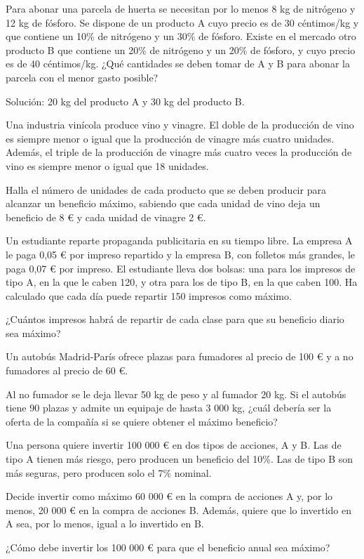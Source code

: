 \begin{Ejer}
Para abonar una parcela de huerta se necesitan por lo menos 8 kg de nitr\'ogeno y 12 kg de f\'osforo. Se dispone de un producto A cuyo precio es de 30 c\'entimos/kg y que contiene un 10\% de nitr\'ogeno y un 30\% de f\'osforo. Existe en el mercado otro producto B que contiene un 20\% de nitr\'ogeno y un 20\% de f\'osforo, y cuyo precio es de 40 c\'entimos/kg. ¿Qu\'e cantidades se deben tomar de A y B para abonar la parcela con el menor gasto posible?

Soluci\'on: 20 kg del producto A y 30 kg del producto B.
\end{Ejer}

\begin{Ejer}
Una industria vin\'icola produce vino y vinagre. El doble de la producci\'on de vino es siempre menor o igual que la producci\'on de vinagre m\'as cuatro unidades. Adem\'as, el triple de la producci\'on de vinagre m\'as cuatro veces la producci\'on de vino es siempre menor o igual que 18 unidades.

Halla el n\'umero de unidades de cada producto que se deben producir para alcanzar un beneficio m\'aximo, sabiendo que cada unidad de vino deja un beneficio de 8 € y cada unidad de vinagre 2 €.
\end{Ejer}


\begin{Ejer}
Un estudiante reparte propaganda publicitaria en su tiempo libre. La empresa A le paga 0,05 € por impreso repartido y la empresa B, con folletos m\'as grandes, le paga 0,07 € por impreso. El estudiante lleva dos bolsas: una para los impresos de tipo A, en la que le caben 120, y otra para los de tipo B, en la que caben 100. Ha calculado que cada d\'ia puede repartir 150 impresos como m\'aximo.

¿Cu\'antos impresos habr\'a de repartir de cada clase para que su beneficio diario sea m\'aximo?
\end{Ejer}

\begin{Ejer}
Un autob\'us Madrid-Par\'is ofrece plazas para fumadores al precio de 100 € y a no fumadores al precio de 60 €.

Al no fumador se le deja llevar 50 kg de peso y al fumador 20 kg. Si el autob\'us tiene 90 plazas y admite un equipaje de hasta 3 000 kg, ¿cu\'al deber\'ia ser la oferta de la compa\~n\'ia si se quiere obtener el m\'aximo beneficio?
\end{Ejer}


\begin{Ejer}
Una persona quiere invertir 100 000 € en dos tipos de acciones, A y B. Las de tipo A tienen m\'as riesgo, pero producen un beneficio del 10\%. Las de tipo B son m\'as seguras, pero producen solo el 7\% nominal.

Decide invertir como m\'aximo 60 000 € en la compra de acciones A y, por lo menos, 20 000 € en la compra de acciones B. Adem\'as, quiere que lo invertido en A sea, por lo menos, igual a lo invertido en B.

¿C\'omo debe invertir los 100 000 € para que el beneficio anual sea m\'aximo?
\end{Ejer}



